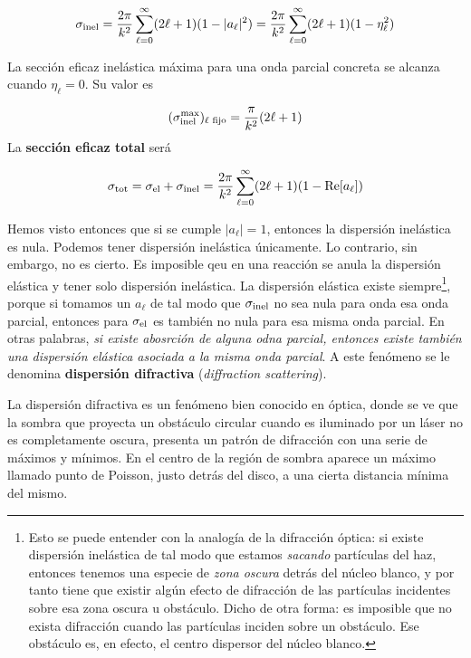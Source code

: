 \begin{mybox}
	\begin{equation}
		\sigma_{\text{inel}} = \frac{2\pi}{k^2} \sum_{\ell=0}^{\infty} (2\ell +1) (1 - |a_\ell|^2)
		= \frac{2\pi}{k^2} \sum_{\ell=0}^{\infty} (2\ell +1) (1 - \eta^2_\ell)
		\label{Ec:03-03-32}
	\end{equation}
\end{mybox}

La sección eficaz inelástica máxima para una onda parcial concreta se alcanza cuando $\eta_\ell=0$. Su valor es

\begin{equation}
	(\sigma_{\text{inel}}^{\max})_{\ell \text{ fijo}} = \frac{\pi}{k^2} (2\ell +1)
\end{equation}
La \textbf{sección eficaz total} será
\begin{mybox}
	\begin{equation}
		\sigma_{\text{tot}} = \sigma_{\text{el}} + \sigma_{\text{inel}} = \frac{2\pi}{k^2} \sum_{\ell=0}^{\infty} (2\ell +1) (1 - \mathrm{Re} [a_\ell])\label{Ec:03-03-34}
	\end{equation}
\end{mybox}
Hemos visto entonces que si se cumple $|a_\ell |=1$, entonces la dispersión inelástica es nula. Podemos tener dispersión inelástica únicamente. Lo contrario, sin embargo, no es cierto. Es imposible qeu en una reacción se anula la dispersión elástica y tener solo dispersión inelástica. La dispersión elástica existe siempre\footnote{Esto se puede entender con la analogía de la difracción óptica: si existe dispersión inelástica de tal modo que estamos \textit{sacando} partículas del haz, entonces tenemos una especie de \textit{zona oscura} detrás del núcleo blanco, y por tanto tiene que existir algún efecto de difracción de las partículas incidentes sobre esa zona oscura u obstáculo. Dicho de otra forma: es imposible que no exista difracción cuando las partículas inciden sobre un obstáculo. Ese obstáculo es, en efecto, el centro dispersor del núcleo blanco.}, porque si tomamos un $a_\ell$ de tal modo que $\sigma_{\text{\text{inel}}}$ no sea nula para onda esa onda parcial, entonces para $\sigma_{\text{el}}$ es también no nula para esa misma onda parcial. En otras palabras, \textit{si existe abosrción de alguna odna parcial, entonces existe también una dispersión elástica asociada a la misma onda parcial}. A este fenómeno se le denomina \textbf{dispersión difractiva} (\textit{diffraction scattering}). 

La dispersión difractiva es un fenómeno bien conocido en óptica, donde se ve que la sombra que proyecta un obstáculo circular cuando es iluminado por un láser no es completamente oscura, presenta un patrón de difracción con una serie de máximos y mínimos. En el centro de la región de sombra aparece un máximo llamado punto de Poisson, justo detrás del disco, a una cierta distancia mínima del mismo.

